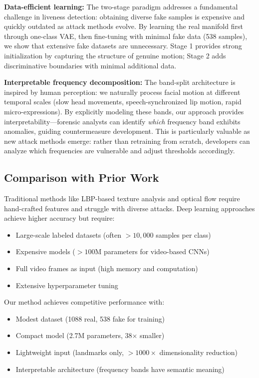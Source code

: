 \documentclass[11pt,twocolumn]{article}
\begin{document}
\textbf{Data-efficient learning:} The two-stage paradigm addresses a fundamental challenge in liveness detection: obtaining diverse fake samples is expensive and quickly outdated as attack methods evolve. By learning the real manifold first through one-class VAE, then fine-tuning with minimal fake data (538 samples), we show that extensive fake datasets are unnecessary. Stage 1 provides strong initialization by capturing the structure of genuine motion; Stage 2 adds discriminative boundaries with minimal additional data.

\textbf{Interpretable frequency decomposition:} The band-split architecture is inspired by human perception: we naturally process facial motion at different temporal scales (slow head movements, speech-synchronized lip motion, rapid micro-expressions). By explicitly modeling these bands, our approach provides interpretability—forensic analysts can identify \emph{which} frequency band exhibits anomalies, guiding countermeasure development. This is particularly valuable as new attack methods emerge: rather than retraining from scratch, developers can analyze which frequencies are vulnerable and adjust thresholds accordingly.

\subsection{Comparison with Prior Work}

Traditional methods like LBP-based texture analysis and optical flow require hand-crafted features and struggle with diverse attacks. Deep learning approaches achieve higher accuracy but require:
\begin{itemize}
    \item Large-scale labeled datasets (often $>10,000$ samples per class)
    \item Expensive models ($>100$M parameters for video-based CNNs)
    \item Full video frames as input (high memory and computation)
    \item Extensive hyperparameter tuning
\end{itemize}

Our method achieves competitive performance with:
\begin{itemize}
    \item Modest dataset (1088 real, 538 fake for training)
    \item Compact model (2.7M parameters, 38$\times$ smaller)
    \item Lightweight input (landmarks only, $>1000\times$ dimensionality reduction)
    \item Interpretable architecture (frequency bands have semantic meaning)
\end{itemize}
\end{document}
